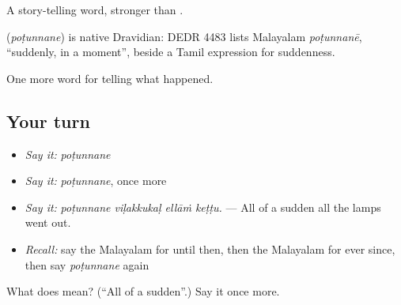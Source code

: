 A story-telling word, stronger than .

\begin{cousinweb}
\textbf{} (\emph{poṭunnane}) is native Dravidian: DEDR 4483 lists Malayalam \emph{poṭunnanē}, \textquotedblleft{}suddenly, in a moment\textquotedblright{}, beside a Tamil expression for suddenness.
\end{cousinweb}

\begin{grammarlens}[title={What you've built}]
One more word for telling what happened.
\end{grammarlens}

\subsection*{Your turn}
\begin{itemize}
\raggedright
  \item \emph{Say it:} \emph{poṭunnane}
  \item \emph{Say it:} \emph{poṭunnane}, once more
  \item \emph{Say it:} \emph{poṭunnane viḷakkukaḷ ellāṁ keṭṭu.} — All of a sudden all the lamps went out.
  \item \emph{Recall:} say the Malayalam for until then, then the Malayalam for ever since, then say \emph{poṭunnane} again
\end{itemize}

\begin{tcolorbox}[breakable,colback=teal!4,colframe=teal!35!black,title={Before you move on}]
What does  mean? (\textquotedblleft{}All of a sudden\textquotedblright{}.) Say it once more.
\end{tcolorbox}
